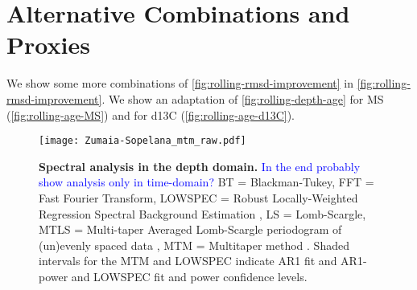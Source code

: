 \documentclass[draft]{agujournal2019}
\newcommand{\ijk}{\textcolor{blue}}
\begin{document}
%
%



%
%
%
%
\appendix

\section{Alternative Combinations and Proxies}

We show some more combinations of \cref{fig:rolling-rmsd-improvement} in \cref{fig:rolling-rmsd-improvement}.
We show an adaptation of \cref{fig:rolling-depth-age} for \gls{MS} (\cref{fig:rolling-age-MS}) and for \gls{d13C} (\cref{fig:rolling-age-d13C}).

\begin{figure}[htb]
  \centering \texttt{[image: Zumaia-Sopelana\_mtm\_raw.pdf]}
  \caption{\label{fig:spectral-depth}
    \textbf{Spectral analysis in the depth domain.}
    \ijk{In the end probably show analysis only in time-domain?}
    BT = Blackman-Tukey,
    FFT = Fast Fourier Transform,
    LOWSPEC = Robust Locally-Weighted Regression Spectral Background Estimation \cite{Meyers2012},
    LS = Lomb-Scargle,
    MTLS = Multi-taper Averaged Lomb-Scargle periodogram of (un)evenly
spaced data \cite{Springford2020},
    MTM = Multitaper method \cite{Thomson1982}.
    Shaded intervals for the MTM and LOWSPEC indicate AR1 fit and AR1-power and LOWSPEC fit and power confidence levels.
  }
\end{figure}
\end{document}
